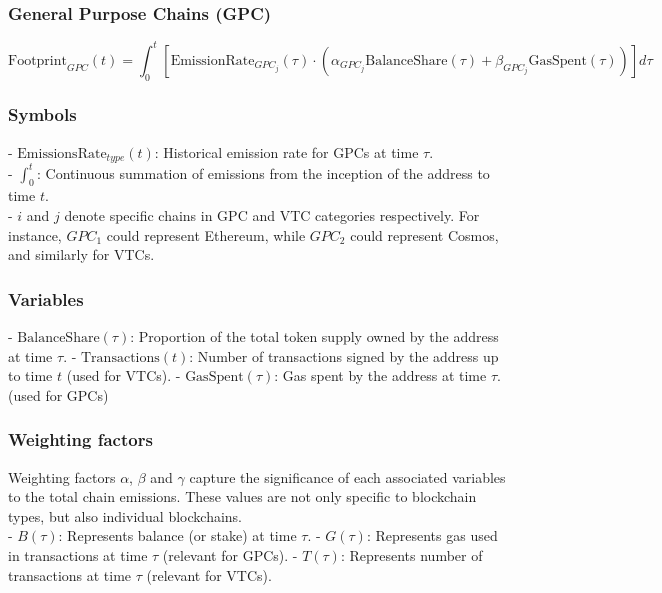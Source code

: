 \documentclass[12pt]{article}
\begin{document}
\subsubsection*{General Purpose Chains (GPC)}
\begin{equation}
\text{Footprint}_{GPC}(t) = \int_{0}^{t} \left[ \text{EmissionRate}_{GPC_j}(\tau) \cdot \left( \alpha_{GPC_j} \text{BalanceShare}(\tau) + \beta_{GPC_j} \text{GasSpent}(\tau) \right) \right] d\tau
\end{equation} 
\subsubsection*{Symbols}
- \(\text{EmissionsRate}_{type}(t)\): Historical emission rate for GPCs at time \(\tau\). \\
- \( \int_{0}^{t} \): Continuous summation of emissions from the inception of the address to time \(t\). \\
- \( i \) and \( j \) denote specific chains in GPC and VTC categories respectively. For instance, \( GPC_1 \) could represent Ethereum, while \( GPC_2 \) could represent Cosmos, and similarly for VTCs.

\subsubsection*{Variables} 
- \(\text{BalanceShare}(\tau)\): Proportion of the total token supply owned by the address at time \(\tau\). 
- \(\text{Transactions}(t)\): Number of transactions signed by the address up to time $t$ (used for VTCs). 
- \(\text{GasSpent}(\tau)\): Gas spent by the address at time \(\tau\). (used for GPCs)
\subsubsection*{Weighting factors} 

Weighting factors $\alpha$, $\beta$ and $\gamma$ capture the significance of each associated variables to the total chain emissions. These values are not only specific to blockchain types, but also individual blockchains. \\ 


- \( B(\tau) \): Represents balance (or stake) at time \( \tau \).
- \( G(\tau) \): Represents gas used in transactions at time \( \tau \) (relevant for GPCs).
- \( T(\tau) \): Represents number of transactions at time \( \tau \) (relevant for VTCs).
\end{document}
